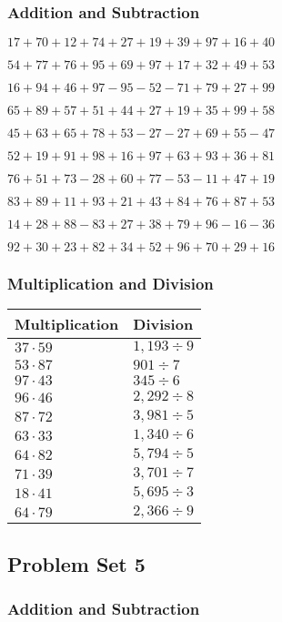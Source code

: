 \hypertarget{addition-and-subtraction-44}{%
\subsubsection{Addition and
Subtraction}\label{addition-and-subtraction-44}}

\(17+70+12+74+27+19+39+97+16+ 40\)

\(54+77+76+95+69+97+17+32+49+53\)

\(16+94+46+97-95-52-71+79+27+99\)

\(65+89+57+51+44+27+19+35+99+58\)

\(45+63+65+78+53-27-27+69+55-47\)

\(52+19+91+98+16+97+63+93+36+81\)

\(76+51+73-28+60+77-53-11+47+19\)

\(83+89+11+93+21+43+84+76+87+53\)

\(14+28+88-83+27+38+79+96-16-36\)

\(92+30+23+82+34+52+96+70+29+16\)

\hypertarget{multiplication-and-division-44}{%
\subsubsection{Multiplication and
Division}\label{multiplication-and-division-44}}

\begin{longtable}[]{@{}ll@{}}
\toprule
Multiplication & Division\tabularnewline
\midrule
\endhead
\(37\cdot59\) & \(1,193÷9\)\tabularnewline
\(53\cdot87\) & \(901÷7\)\tabularnewline
\(97\cdot43\) & \(345÷6\)\tabularnewline
\(96\cdot46\) & \(2,292÷8\)\tabularnewline
\(87\cdot72\) & \(3,981÷5\)\tabularnewline
\(63\cdot33\) & \(1,340÷6\)\tabularnewline
\(64\cdot82\) & \(5,794÷5\)\tabularnewline
\(71\cdot39\) & \(3,701÷7\)\tabularnewline
\(18\cdot41\) & \(5,695÷3\)\tabularnewline
\(64\cdot79\) & \(2,366÷9\)\tabularnewline
\bottomrule
\end{longtable}

\hypertarget{problem-set-5-1}{%
\subsection{Problem Set 5}\label{problem-set-5-1}}

\hypertarget{addition-and-subtraction-45}{%
\subsubsection{Addition and
Subtraction}\label{addition-and-subtraction-45}}

